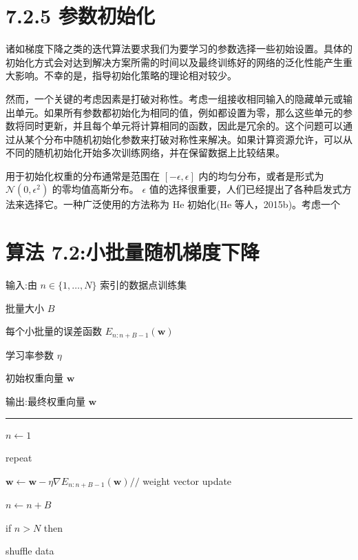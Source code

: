 \documentclass[10pt]{report}
\newcommand{\HRule}{\begin{center}\rule{0.9\linewidth}{0.2mm}\end{center}}
\begin{document}
\section*{7.2.5 参数初始化}

诸如梯度下降之类的迭代算法要求我们为要学习的参数选择一些初始设置。具体的初始化方式会对达到解决方案所需的时间以及最终训练好的网络的泛化性能产生重大影响。不幸的是，指导初始化策略的理论相对较少。

然而，一个关键的考虑因素是打破对称性。考虑一组接收相同输入的隐藏单元或输出单元。如果所有参数都初始化为相同的值，例如都设置为零，那么这些单元的参数将同时更新，并且每个单元将计算相同的函数，因此是冗余的。这个问题可以通过从某个分布中随机初始化参数来打破对称性来解决。如果计算资源允许，可以从不同的随机初始化开始多次训练网络，并在保留数据上比较结果。

用于初始化权重的分布通常是范围在 \(\left\lbrack  {-\epsilon ,\epsilon }\right\rbrack\) 内的均匀分布，或者是形式为 \(\mathcal{N}\left( {0,{\epsilon }^{2}}\right)\) 的零均值高斯分布。 \(\epsilon\) 值的选择很重要，人们已经提出了各种启发式方法来选择它。一种广泛使用的方法称为 He 初始化(He 等人，2015b)。考虑一个

\section*{算法 7.2:小批量随机梯度下降}

输入:由 \(n \in  \{ 1,\ldots ,N\}\) 索引的数据点训练集

批量大小 \(B\)

每个小批量的误差函数 \({E}_{n : n + B - 1}\left( \mathbf{w}\right)\)

学习率参数 \(\eta\)

初始权重向量 \(\mathbf{w}\)

输出:最终权重向量 \(\mathbf{w}\)

\HRule

\(n \leftarrow  1\)

repeat

\hspace*{1em} \(\mathbf{w} \leftarrow  \mathbf{w} - \eta \nabla {E}_{n : n + B - 1}\left( \mathbf{w}\right) //\) weight vector update

\hspace*{1em} \(n \leftarrow  n + B\)

\hspace*{1em} if \(n > N\) then

\hspace*{2em} shuffle data
\end{document}
